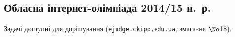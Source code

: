\renewenvironment{problemAllDefault}[1]{\vspace{10mm}\par\begin{problem}{#1}{Клавіатура (stdin)}{Екран (stdout)}{1 сек}{64 мегабайти}}{\end{problem}}

\subsection{Обласна інтернет-олімпіада 2014/15 н.~р.}

Задачі доступні для дорішування (\verb"ejudge.ckipo.edu.ua", змагання $\No$18).

\vspace{-0.5\baselineskip minus 1cm}
	

	

	


